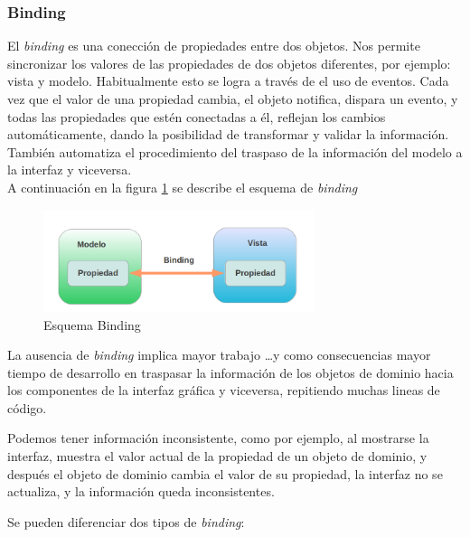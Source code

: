 

\subsubsection{Binding}
\label{binding}

	El \emph{binding} es una conección de propiedades entre dos objetos. 
	Nos permite sincronizar los valores de las propiedades de dos objetos
	diferentes, por ejemplo: vista y modelo. Habitualmente esto se logra a través de
	el uso de eventos.
	Cada vez que el valor de una propiedad cambia, el objeto notifica, dispara un
	evento, y todas las propiedades que estén conectadas a él,
	reflejan los cambios automáticamente, dando la posibilidad de transformar y
	validar la información.\\
	También automatiza el procedimiento del traspaso de la información del
	modelo a la interfaz y viceversa.\\
	
	A continuación en la figura \ref{binding} se describe el esquema de
		\emph{binding}
		
		\begin{figure}[h]
			\centering
			\includegraphics[width=300px]{img/binding}
			\caption{Esquema Binding}
			\label{binding}
		\end{figure}
		
		\bigskip
	
	La ausencia de \emph{binding} implica mayor trabajo \ldots y como consecuencias
	 mayor tiempo de desarrollo en  traspasar la información de los
	objetos de dominio hacia los componentes de la interfaz gráfica y viceversa, repitiendo muchas lineas de código.
	
	Podemos tener información inconsistente, como por ejemplo, al mostrarse la interfaz,
	muestra el valor actual de la propiedad de un objeto de dominio, y después el
	objeto de dominio cambia el valor de su propiedad, la interfaz no se actualiza,
	y la información queda inconsistentes.
	
	\bigskip
	
	Se pueden diferenciar dos tipos de \emph{binding}:
	
